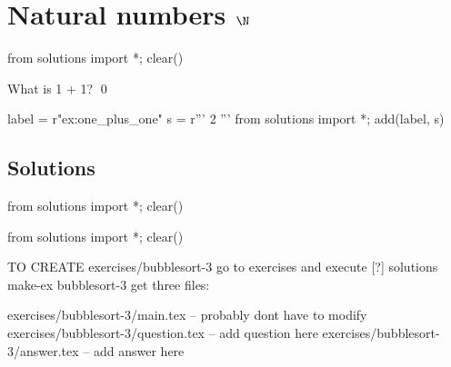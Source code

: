 
\section{Natural numbers $\N$}
\begin{python0}
from solutions import *; clear()
\end{python0}


\begin{ex}
  \label{ex:introduction-to-group-theory-0}
  What is 1 + 1?
  \qed
\end{ex}
\begin{python0}
label = r"ex:one_plus_one"
s = r'''
2
'''
from solutions import *; add(label, s)
\end{python0}


\newpage
\subsection{Solutions}








\begin{python0}
from solutions import *; clear()
\end{python0}



\begin{python0}
from solutions import *; clear()
\end{python0}

\newpage

TO CREATE exercises/bubblesort-3 go to exercises and execute
[?] solutions make-ex bubblesort-3
get three files:

exercises/bubblesort-3/main.tex -- probably dont have to modify
exercises/bubblesort-3/question.tex -- add question here
exercises/bubblesort-3/answer.tex -- add answer here

